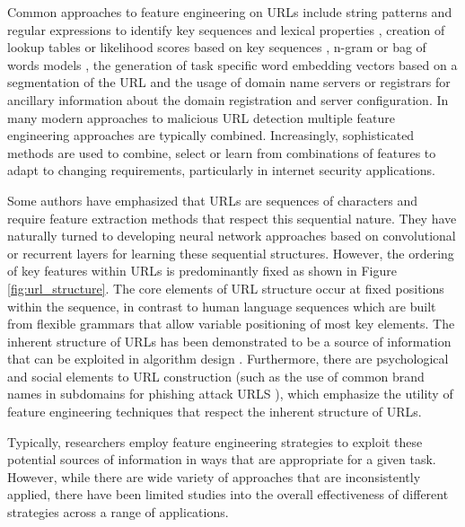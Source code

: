 \documentclass{aircc}
\begin{document}
Common approaches to feature engineering on URLs include string patterns and regular expressions to
identify key sequences and lexical properties \cite{Kan2004,Garera2007,Mamun2016,Tupsamudre2019}, 
creation of lookup tables or likelihood scores based on key sequences
\cite{Meshkizadeh2010}, n-gram or bag of words models \cite{Baykan2009,Verma2017}, 
the generation of task specific word embedding vectors based on a segmentation of the URL \cite{Le2018,Qiu2020} and the
usage of domain name servers or registrars for ancillary information about the domain registration 
and server configuration\cite{Canali2011,Li2020}. In many modern approaches to malicious URL detection
multiple feature engineering approaches are typically combined\cite{Sayamber2014,Li2020}. Increasingly,
sophisticated methods are used to combine, select or learn from combinations of features to adapt to
changing requirements, particularly in internet security applications\cite{Sountharrajan2020,Li2020}.

Some authors have 
emphasized that URLs are sequences of characters and require feature extraction methods that respect 
this sequential nature\cite{Le2018,Vazhayil2018}. They have naturally turned to developing neural network approaches
based on convolutional or recurrent layers for learning these sequential structures.
However, the ordering of key features within URLs is predominantly fixed as shown in Figure \ref{fig:url_structure}.
The core elements of URL structure occur at fixed positions within the sequence, in contrast to human language
sequences which are built from flexible grammars that allow variable positioning of most key elements. The
inherent structure of URLs has been demonstrated to be a source of information that can be exploited in 
algorithm design \cite{Shih2004}. Furthermore,
there are psychological and social elements to URL construction (such as the use of common brand names in subdomains
for phishing attack URLS \cite{Tupsamudre2019}), which emphasize the utility of feature engineering techniques that
respect the inherent structure of URLs.

Typically, researchers employ feature engineering strategies to exploit these potential sources of information
in ways that are appropriate for a given task. However, while there are wide variety
of approaches that are inconsistently applied, there have been limited studies into
the overall effectiveness of different strategies across a range of applications.
\end{document}
